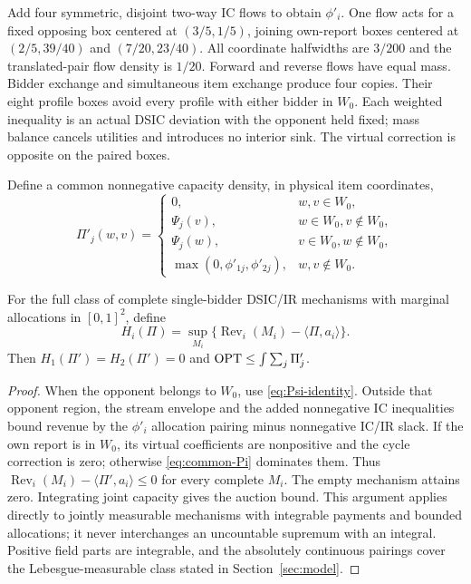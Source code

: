 Add four symmetric, disjoint two-way IC flows to obtain $\phi'_i$.
One flow acts for a fixed opposing box centered at $(3/5,1/5)$, joining
own-report boxes centered at $(2/5,39/40)$ and $(7/20,23/40)$.
All coordinate halfwidths are $3/200$ and the translated-pair flow density
is $1/20$. Forward and reverse flows have equal mass. Bidder exchange
and simultaneous item exchange produce four copies. Their eight profile
boxes avoid every profile with either bidder in $W_0$.
Each weighted inequality is an actual DSIC deviation with the opponent
held fixed; mass balance cancels utilities and introduces no interior sink.
The virtual correction is opposite on the paired boxes.

Define a common nonnegative capacity density, in physical item coordinates,
\begin{equation}\label{eq:common-Pi}
 \Pi'_j(w,v)=\begin{cases}
 0,&w,v\in W_0,\\
 \Psi_j(v),&w\in W_0, v\notin W_0,\\
 \Psi_j(w),&v\in W_0, w\notin W_0,\\
 \max(0,\phi'_{1j},\phi'_{2j}),&w,v\notin W_0.
 \end{cases}
\end{equation}
\begin{theorem}\label{thm:common-support}
For the full class of complete single-bidder DSIC/IR mechanisms with
marginal allocations in $[0,1]^2$, define
\[
H_i(\Pi)=\sup_{M_i}\{\operatorname{Rev}_i(M_i)-\langle\Pi,a_i\rangle\}.
\]
Then $H_1(\Pi')=H_2(\Pi')=0$ and
$\operatorname{OPT}\le\int\sum_j\Pi'_j$.
\end{theorem}
\begin{proof}
When the opponent belongs to $W_0$, use \eqref{eq:Psi-identity}.
Outside that opponent region, the stream envelope and the added
nonnegative IC inequalities bound revenue by the $\phi'_i$ allocation
pairing minus nonnegative IC/IR slack. If the own report is in $W_0$,
its virtual coefficients are nonpositive and the cycle correction is zero;
otherwise \eqref{eq:common-Pi} dominates them. Thus
$\operatorname{Rev}_i(M_i)-\langle\Pi',a_i\rangle\le0$ for every complete $M_i$.
The empty mechanism attains zero. Integrating joint capacity gives the
auction bound. This argument applies directly to jointly measurable
mechanisms with integrable payments and bounded allocations; it never
interchanges an uncountable supremum with an integral. Positive field
parts are integrable, and the absolutely continuous pairings cover the
Lebesgue-measurable class stated in Section~\ref{sec:model}.
\end{proof}
